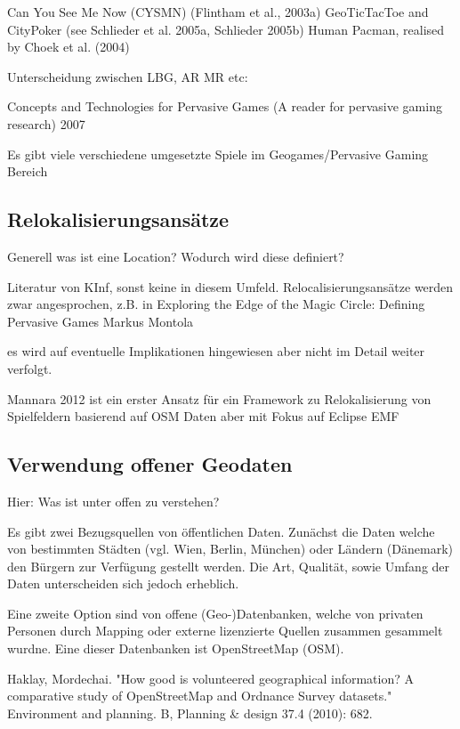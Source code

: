 Can You See Me Now (CYSMN) (Flintham et al., 2003a)
GeoTicTacToe and CityPoker (see Schlieder et al. 2005a, Schlieder 2005b)
Human Pacman, realised by Choek et al. (2004)

Unterscheidung zwischen LBG, AR MR etc:

Concepts and Technologies for Pervasive Games (A reader for pervasive gaming research) 2007

Es gibt viele verschiedene umgesetzte Spiele im Geogames/Pervasive Gaming Bereich

\subsection{Relokalisierungsansätze}

Generell was ist eine Location?
Wodurch wird diese definiert?


Literatur von KInf, sonst keine in diesem Umfeld.
Relocalisierungsansätze werden zwar angesprochen, z.B. in 
Exploring the Edge of the Magic Circle: 
Defining Pervasive Games 
Markus Montola 

es wird auf eventuelle Implikationen hingewiesen aber nicht im Detail weiter verfolgt.

Mannara 2012 ist ein erster Ansatz für ein Framework zu Relokalisierung von Spielfeldern basierend auf OSM Daten aber mit Fokus auf Eclipse EMF

\subsection{Verwendung offener Geodaten}
\label{subsec:S3_offeneGeodaten}

Hier: Was ist unter offen zu verstehen?

Es gibt zwei Bezugsquellen von öffentlichen Daten.
Zunächst die Daten welche von bestimmten Städten (vgl. Wien, Berlin, München) oder Ländern (Dänemark) den Bürgern zur Verfügung gestellt werden. Die Art, Qualität, sowie Umfang der Daten unterscheiden sich jedoch erheblich.

Eine zweite Option sind von offene (Geo-)Datenbanken, welche von privaten Personen durch Mapping oder externe lizenzierte Quellen zusammen gesammelt wurdne. Eine dieser Datenbanken ist OpenStreetMap (OSM).


Haklay, Mordechai. "How good is volunteered geographical information? A comparative study of OpenStreetMap and Ordnance Survey datasets." Environment and planning. B, Planning \& design 37.4 (2010): 682.


